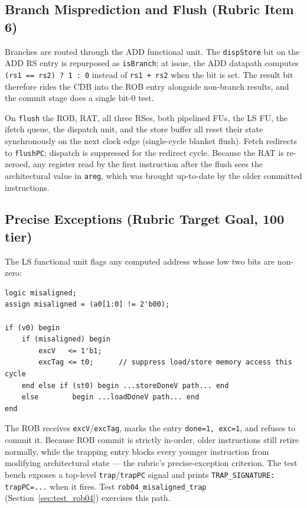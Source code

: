 \documentclass[11pt]{article}
\begin{document}
\subsection{Branch Misprediction and Flush (Rubric Item 6)}

Branches are routed through the ADD functional unit. The \texttt{dispStore}
bit on the ADD RS entry is repurposed as \texttt{isBranch}; at issue, the ADD
datapath computes \texttt{(rs1 == rs2) ? 1 : 0} instead of \texttt{rs1 + rs2}
when the bit is set. The result bit therefore rides the CDB into the ROB entry
alongside non-branch results, and the commit stage does a single bit-0 test.

On \texttt{flush} the ROB, RAT, all three RSes, both pipelined FUs, the LS FU,
the ifetch queue, the dispatch unit, and the store buffer all reset their state
synchronously on the next clock edge (single-cycle blanket flush). Fetch
redirects to \texttt{flushPC}; dispatch is suppressed for the redirect cycle.
Because the RAT is re-zeroed, any register read by the first instruction after
the flush sees the architectural value in \texttt{areg}, which was brought
up-to-date by the older committed instructions.

\subsection{Precise Exceptions (Rubric Target Goal, 100 tier)}
\label{sec:precise_exc}

The LS functional unit flags any computed address whose low two bits are
non-zero:

\begin{lstlisting}[style=verilog, caption=Misaligned-address detection in fu\_ls]
logic misaligned;
assign misaligned = (a0[1:0] != 2'b00);

if (v0) begin
    if (misaligned) begin
        excV   <= 1'b1;
        excTag <= t0;      // suppress load/store memory access this cycle
    end else if (st0) begin ...storeDoneV path... end
    else        begin ...loadDoneV path... end
end
\end{lstlisting}

The ROB receives \texttt{excV}/\texttt{excTag}, marks the entry
\texttt{done=1, exc=1}, and refuses to commit it. Because ROB commit is
strictly in-order, older instructions still retire normally, while the
trapping entry blocks every younger instruction from modifying architectural
state --- the rubric's precise-exception criterion. The test bench exposes
a top-level \texttt{trap}/\texttt{trapPC} signal and prints
\texttt{TRAP\_SIGNATURE: trapPC=...} when it fires. Test
\texttt{rob04\_misaligned\_trap} (Section~\ref{sec:test_rob04}) exercises this
path.
\end{document}
